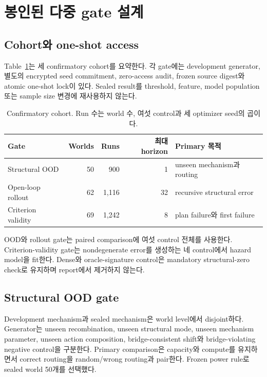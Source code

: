 \section{봉인된 다중 gate 설계}
\label{sec:design}

\subsection{Cohort와 one-shot access}

Table~\ref{tab:gates}는 세 confirmatory cohort를 요약한다. 각 gate에는
development generator, 별도의 encrypted seed commitment, zero-access audit,
frozen source digest와 atomic one-shot lock이 있다. Sealed result를 threshold,
feature, model population 또는 sample size 변경에 재사용하지 않는다.

\begin{table}[ht]
\centering
\caption{Confirmatory cohort. Run 수는 world 수, 여섯 control과 세 optimizer
seed의 곱이다.}
\label{tab:gates}
\begin{tabular}{lrrrl}
\toprule
Gate & Worlds & Runs & 최대 horizon & Primary 목적 \\
\midrule
Structural OOD & 50 & 900 & 1 & unseen mechanism과 routing \\
Open-loop rollout & 62 & 1,116 & 32 & recursive structural error \\
Criterion validity & 69 & 1,242 & 8 & plan failure와 first failure \\
\bottomrule
\end{tabular}
\end{table}

OOD와 rollout gate는 paired comparison에 여섯 control 전체를 사용한다.
Criterion-validity gate는 nondegenerate error를 생성하는 네 control에서 hazard
model을 fit한다. Dense와 oracle-signature control은 mandatory structural-zero
check로 유지하며 report에서 제거하지 않는다.

\subsection{Structural OOD gate}

Development mechanism과 sealed mechanism은 world level에서 disjoint하다.
Generator는 unseen recombination, unseen structural mode, unseen mechanism
parameter, unseen action composition, bridge-consistent shift와
bridge-violating negative control을 구분한다. Primary comparison은 capacity와
compute를 유지하면서 correct routing을 random/wrong routing과 pair한다.
Frozen power rule로 sealed world 50개를 선택했다.

